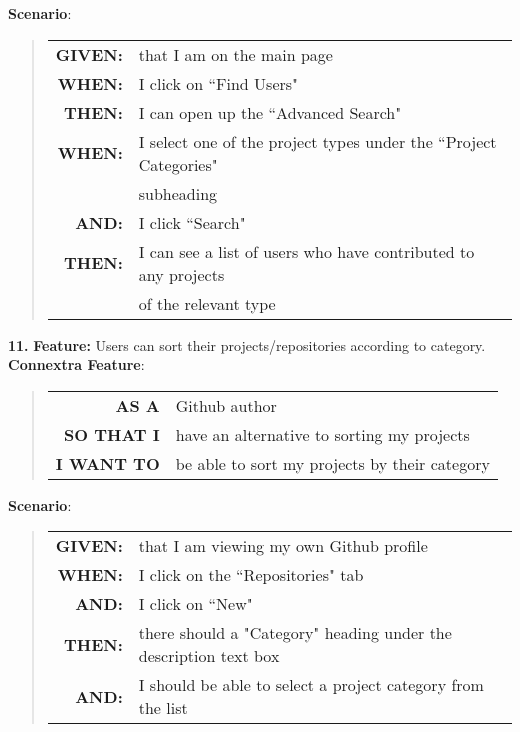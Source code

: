 \documentclass[12pt]{article}
\newcommand{\Feature}[1]{ 
   \noindent \textbf{Feature:} #1
}
\newcommand{\GivenSc} {
	\noindent \textbf{GIVEN:}
	}
\newcommand{\WhenSc} {
	\noindent \textbf{WHEN:}
	}
\newcommand{\AndSc} {
	\noindent \textbf{AND:}
	}
\newcommand{\ThenSc} {
	\noindent \textbf{THEN:}
	}
\begin{document}
\begin{framed}
\noindent \textbf{Scenario}:
\begin{quote}
\begin{tabular}{rl}
\GivenSc & that I am on the main page\\
\WhenSc  & I click on ``Find Users"\\
\ThenSc  & I can open up the ``Advanced Search"\\
\WhenSc  & I select one of the project types under the ``Project Categories"\\
         & subheading\\ 
\AndSc   & I click ``Search"\\
\ThenSc  & I can see a list of users who have contributed to any projects \\
         & of the relevant type
\end{tabular}
\end{quote}

\pagebreak

\noindent\textbf{11.}\Feature{Users can sort their projects/repositories according to category.}\\[0.2cm]

\noindent \textbf{Connextra Feature}:
\begin{quote}
\begin{tabular}{rl}
\textbf{AS A}      & \textsf{Github} author\\
\textbf{SO THAT I} & have an alternative to sorting my projects\\
\textbf{I WANT TO} & be able to sort my projects by their category \\
\end{tabular}
\end{quote}


\noindent \textbf{Scenario}:
\begin{quote}
\begin{tabular}{rl}
\GivenSc & that I am viewing my own \textsf{Github} profile\\
\WhenSc  & I click on the ``Repositories" tab\\
\AndSc   & I click on ``New"\\
\ThenSc  & there should a "Category" heading under the description text box\\
\AndSc   & I should be able to select a project category from the list
\end{tabular}
\end{quote}


\end{framed}
\end{document}
